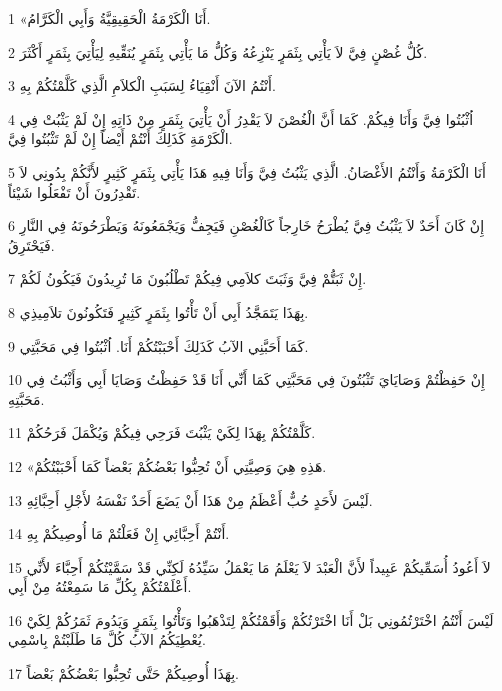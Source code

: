 \par 1 «أَنَا الْكَرْمَةُ الْحَقِيقِيَّةُ وَأَبِي الْكَرَّامُ.
\par 2 كُلُّ غُصْنٍ فِيَّ لاَ يَأْتِي بِثَمَرٍ يَنْزِعُهُ وَكُلُّ مَا يَأْتِي بِثَمَرٍ يُنَقِّيهِ لِيَأْتِيَ بِثَمَرٍ أَكْثَرَ.
\par 3 أَنْتُمُ الآنَ أَنْقِيَاءُ لِسَبَبِ الْكلاَمِ الَّذِي كَلَّمْتُكُمْ بِهِ.
\par 4 اُثْبُتُوا فِيَّ وَأَنَا فِيكُمْ. كَمَا أَنَّ الْغُصْنَ لاَ يَقْدِرُ أَنْ يَأْتِيَ بِثَمَرٍ مِنْ ذَاتِهِ إِنْ لَمْ يَثْبُتْ فِي الْكَرْمَةِ كَذَلِكَ أَنْتُمْ أَيْضاً إِنْ لَمْ تَثْبُتُوا فِيَّ.
\par 5 أَنَا الْكَرْمَةُ وَأَنْتُمُ الأَغْصَانُ. الَّذِي يَثْبُتُ فِيَّ وَأَنَا فِيهِ هَذَا يَأْتِي بِثَمَرٍ كَثِيرٍ لأَنَّكُمْ بِدُونِي لاَ تَقْدِرُونَ أَنْ تَفْعَلُوا شَيْئاً.
\par 6 إِنْ كَانَ أَحَدٌ لاَ يَثْبُتُ فِيَّ يُطْرَحُ خَارِجاً كَالْغُصْنِ فَيَجِفُّ وَيَجْمَعُونَهُ وَيَطْرَحُونَهُ فِي النَّارِ فَيَحْتَرِقُ.
\par 7 إِنْ ثَبَتُّمْ فِيَّ وَثَبَتَ كلاَمِي فِيكُمْ تَطْلُبُونَ مَا تُرِيدُونَ فَيَكُونُ لَكُمْ.
\par 8 بِهَذَا يَتَمَجَّدُ أَبِي أَنْ تَأْتُوا بِثَمَرٍ كَثِيرٍ فَتَكُونُونَ تلاَمِيذِي.
\par 9 كَمَا أَحَبَّنِي الآبُ كَذَلِكَ أَحْبَبْتُكُمْ أَنَا. اُثْبُتُوا فِي مَحَبَّتِي.
\par 10 إِنْ حَفِظْتُمْ وَصَايَايَ تَثْبُتُونَ فِي مَحَبَّتِي كَمَا أَنِّي أَنَا قَدْ حَفِظْتُ وَصَايَا أَبِي وَأَثْبُتُ فِي مَحَبَّتِهِ.
\par 11 كَلَّمْتُكُمْ بِهَذَا لِكَيْ يَثْبُتَ فَرَحِي فِيكُمْ وَيُكْمَلَ فَرَحُكُمْ.
\par 12 «هَذِهِ هِيَ وَصِيَّتِي أَنْ تُحِبُّوا بَعْضُكُمْ بَعْضاً كَمَا أَحْبَبْتُكُمْ.
\par 13 لَيْسَ لأَحَدٍ حُبٌّ أَعْظَمُ مِنْ هَذَا أَنْ يَضَعَ أَحَدٌ نَفْسَهُ لأَجْلِ أَحِبَّائِهِ.
\par 14 أَنْتُمْ أَحِبَّائِي إِنْ فَعَلْتُمْ مَا أُوصِيكُمْ بِهِ.
\par 15 لاَ أَعُودُ أُسَمِّيكُمْ عَبِيداً لأَنَّ الْعَبْدَ لاَ يَعْلَمُ مَا يَعْمَلُ سَيِّدُهُ لَكِنِّي قَدْ سَمَّيْتُكُمْ أَحِبَّاءَ لأَنِّي أَعْلَمْتُكُمْ بِكُلِّ مَا سَمِعْتُهُ مِنْ أَبِي.
\par 16 لَيْسَ أَنْتُمُ اخْتَرْتُمُونِي بَلْ أَنَا اخْتَرْتُكُمْ وَأَقَمْتُكُمْ لِتَذْهَبُوا وَتَأْتُوا بِثَمَرٍ وَيَدُومَ ثَمَرُكُمْ لِكَيْ يُعْطِيَكُمُ الآبُ كُلَّ مَا طَلَبْتُمْ بِاسْمِي.
\par 17 بِهَذَا أُوصِيكُمْ حَتَّى تُحِبُّوا بَعْضُكُمْ بَعْضاً.
